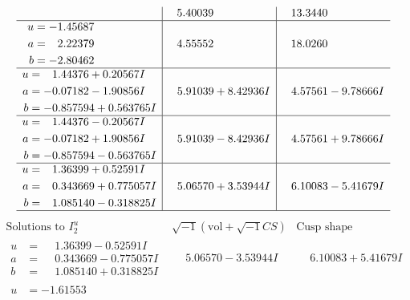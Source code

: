 \documentclass[1p]{elsarticle_modified}
\theoremstyle{definition}
\newcommand{\I}{\sqrt{-1}}
\begin{document}
$$\begin{array}{c|c|c}
 & \phantom{-}5.40039\phantom{ +0.000000I} & \phantom{-}13.3440\phantom{ +0.000000I} \\ \hline\begin{aligned}
u &= -1.45687\phantom{ +0.000000I} \\
a &= \phantom{-}2.22379\phantom{ +0.000000I} \\
b &= -2.80462\phantom{ +0.000000I}\end{aligned}
 & \phantom{-}4.55552\phantom{ +0.000000I} & \phantom{-}18.0260\phantom{ +0.000000I} \\ \hline\begin{aligned}
u &= \phantom{-}1.44376 + 0.20567 I \\
a &= -0.07182 - 1.90856 I \\
b &= -0.857594 + 0.563765 I\end{aligned}
 & \phantom{-}5.91039 + 8.42936 I & \phantom{-}4.57561 - 9.78666 I \\ \hline\begin{aligned}
u &= \phantom{-}1.44376 - 0.20567 I \\
a &= -0.07182 + 1.90856 I \\
b &= -0.857594 - 0.563765 I\end{aligned}
 & \phantom{-}5.91039 - 8.42936 I & \phantom{-}4.57561 + 9.78666 I \\ \hline\begin{aligned}
u &= \phantom{-}1.36399 + 0.52591 I \\
a &= \phantom{-}0.343669 + 0.775057 I \\
b &= \phantom{-}1.085140 - 0.318825 I\end{aligned}
 & \phantom{-}5.06570 + 3.53944 I & \phantom{-}6.10083 - 5.41679 I\\
 \hline 
 \end{array}$$\newpage$$\begin{array}{c|c|c}  
\text{Solutions to }I^u_{2}& \I (\text{vol} + \sqrt{-1}CS) & \text{Cusp shape}\\
 \hline 
\begin{aligned}
u &= \phantom{-}1.36399 - 0.52591 I \\
a &= \phantom{-}0.343669 - 0.775057 I \\
b &= \phantom{-}1.085140 + 0.318825 I\end{aligned}
 & \phantom{-}5.06570 - 3.53944 I & \phantom{-}6.10083 + 5.41679 I \\ \hline\begin{aligned}
u &= -1.61553\phantom{ +0.000000I} \\

\end{aligned}
\end{array}$$
\end{document}
